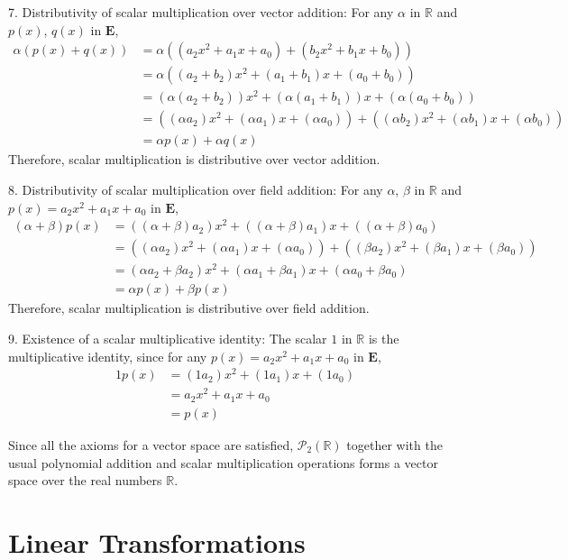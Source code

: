 \documentclass{article}
\begin{document}
7. Distributivity of scalar multiplication over vector addition: For any $\alpha$ in $\mathbb{R}$ and $p(x)$, $q(x)$ in $\mathbf{E}$,
\begin{align*}
    \alpha (p(x) + q(x)) & = \alpha ((a_2 x^2 + a_1 x + a_0) + (b_2 x^2 + b_1 x + b_0))                                              \\
                         & = \alpha ((a_2 + b_2) x^2 + (a_1 + b_1) x + (a_0 + b_0))                                                  \\
                         & = (\alpha (a_2 + b_2)) x^2 + (\alpha (a_1 + b_1)) x + (\alpha (a_0 + b_0))                                \\
                         & = ((\alpha a_2) x^2 + (\alpha a_1) x + (\alpha a_0)) + ((\alpha b_2) x^2 + (\alpha b_1) x + (\alpha b_0)) \\
                         & = \alpha p(x) + \alpha q(x)
\end{align*}
Therefore, scalar multiplication is distributive over vector addition.

8. Distributivity of scalar multiplication over field addition: For any $\alpha$, $\beta$ in $\mathbb{R}$ and $p(x) = a_2 x^2 + a_1 x + a_0$ in $\mathbf{E}$,
\begin{align*}
    (\alpha + \beta) p(x) & = ((\alpha + \beta) a_2) x^2 + ((\alpha + \beta) a_1) x + ((\alpha + \beta) a_0)                       \\
                          & = ((\alpha a_2) x^2 + (\alpha a_1) x + (\alpha a_0)) + ((\beta a_2) x^2 + (\beta a_1) x + (\beta a_0)) \\
                          & = (\alpha a_2 + \beta a_2) x^2 + (\alpha a_1 + \beta a_1) x + (\alpha a_0 + \beta a_0)                 \\
                          & = \alpha p(x) + \beta p(x)
\end{align*}
Therefore, scalar multiplication is distributive over field addition.

9. Existence of a scalar multiplicative identity: The scalar $1$ in $\mathbb{R}$ is the multiplicative identity, since for any $p(x) = a_2 x^2 + a_1 x + a_0$ in $\mathbf{E}$,
\begin{align*}
    1 p(x) & = (1 a_2) x^2 + (1 a_1) x + (1 a_0) \\
           & = a_2 x^2 + a_1 x + a_0             \\
           & = p(x)
\end{align*}

Since all the axioms for a vector space are satisfied, $\mathcal{P}_2(\mathbb{R})$ together with the usual polynomial addition and scalar multiplication operations forms a vector space over the real numbers $\mathbb{R}$.

\section{Linear Transformations}
\end{document}
